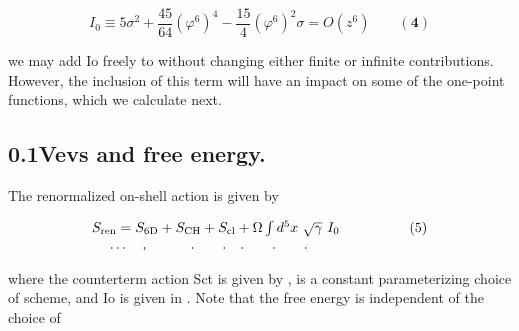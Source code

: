 \documentclass{article}
\begin{document}
\begin{equation}
I _ { 0 } \equiv 5 \sigma ^ { 2 } + \frac { 4 5 } { 6 4 } ( \varphi ^ { 6 } ) ^ { 4 } - \frac { 1 5 } { 4 } ( \varphi ^ { 6 } ) ^ { 2 } \sigma = O ( z ^ { 6 } ) \qquad ( \mathbf { 4 } )
\end{equation}


we may add Io freely to without changing either finite or infinite contributions. However,
the inclusion of this term will have an impact on some of the one-point functions, which we
calculate next.


\subsection*{0.1Vevs and free energy.}


The renormalized on-shell action is given by


\begin{equation}
\begin{array} { c c c } { S _ { \mathrm { r e n } } = S _ { \mathrm { 6 D } } + S _ { \mathrm { C H } } + S _ { \mathrm { c l } } + \Omega \int d ^ { 5 } x ~ \sqrt { \gamma } ~ I _ { 0 } } & { \qquad \qquad ( 5 ) } \\ { \dots \quad, \quad \quad \quad. \quad \quad. \quad. \quad \quad. \quad \quad. \quad } \end{array}
\end{equation}


where the counterterm action Sct is given by ,  is a constant parameterizing choice of
scheme, and Io is given in . Note that the free energy is independent of the choice of
\end{document}
